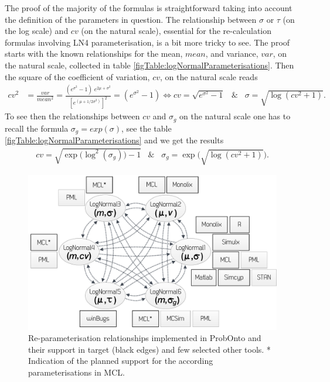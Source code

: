{The proof of the majority of the formulas is straightforward taking into account the definition
of the parameters in question. The relationship between $\sigma$ or $\tau$ (on the log scale) 
and $cv$ (on the natural scale), essential for the re-calculation formulas involving
LN4 parameterisation, is a bit more tricky to see. The 
proof starts with the known relationships for the mean, $mean$, and variance, $var$, on the natural 
scale, collected in table \ref{figTable:logNormalParameterisations}. 
Then the square of the coefficient of variation, $cv$, on the natural scale reads
\begin{align}
	cv^2 &= \frac{var}{mean^2} = \frac{(e^{\sigma^2}-1)\; e^{2\mu + \sigma^2}}{[e^{(\mu + 1/2\sigma^2)}]^2}
	= (e^{\sigma^2}-1) \Leftrightarrow cv = \sqrt{e^{\sigma^2}-1} \;\;\; \& \;\;\; \sigma=\sqrt{\log(cv^2 + 1)}. \nonumber
\end{align}
To see then the relationships between $cv$ and $\sigma_g$ on the natural scale 
one has to recall the formula $\sigma_g = exp(\sigma)$, see the 
table \ref{figTable:logNormalParameterisations} and we get the results
\begin{align}
	cv=\sqrt{\exp\!\big(\log^2(\sigma_g)\big) -1} \;\;\; \& \;\;\; \sigma_g=\exp\!\big(\sqrt{\log(cv^2+1)}\big) .\nonumber
\end{align}

\begin{figure}[htb!]
\centering
 \includegraphics[width=145mm]{pics/LNreparams}
\caption{Re-parameterisation relationships implemented in ProbOnto and their support 
in target (black edges) and few selected other tools. * Indication of the 
planned support for the according parameterisations in MCL.}
\label{fig:LNreparams}
\end{figure}

}
